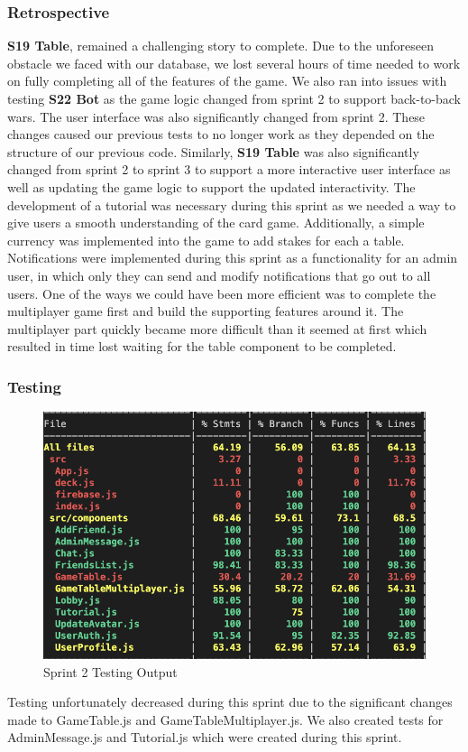 \subsubsection{Retrospective}
\textbf{S19 Table}, remained a challenging story to complete. Due to the unforeseen obstacle we faced with our database, we lost several hours of time needed to work on fully completing all of the features of the game. We also ran into issues with testing \textbf{S22 Bot} as the game logic changed from sprint 2 to support back-to-back wars. The user interface was also significantly changed from sprint 2. These changes caused our previous tests to no longer work as they depended on the structure of our previous code. Similarly, \textbf{S19 Table} was also significantly changed from sprint 2 to sprint 3 to support a more interactive user interface as well as updating the game logic to support the updated interactivity. The development of a tutorial was necessary during this sprint as we needed a way to give users a smooth understanding of the card game. Additionally, a simple currency was implemented into the game to add stakes for each a table. Notifications were implemented during this sprint as a functionality for an admin user, in which only they can send and modify notifications that go out to all users. One of the ways we could have been more efficient was to complete the multiplayer game first and build the supporting features around it. The multiplayer part quickly became more difficult than it seemed at first which resulted in time lost waiting for the table component to be completed. 


\subsubsection {Testing}
\begin{figure}[h]
    \centering
    \includegraphics[width=1\linewidth]{figures/Testing sprint 3.png}  %
    \caption{Sprint 2 Testing Output}
    \label{fig:enter-label}
\end{figure}
Testing unfortunately decreased during this sprint due to the significant changes made to GameTable.js and GameTableMultiplayer.js. We also created tests for AdminMessage.js and Tutorial.js which were created during this sprint. 

